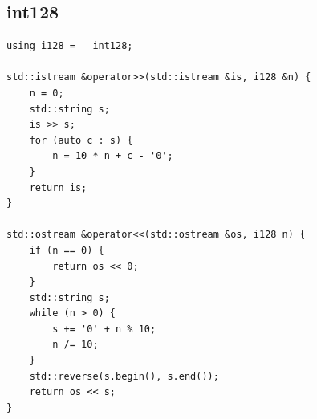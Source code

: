 \documentclass[twoside]{article}
\begin{document}
\subsection{int128}
\begin{lstlisting}
using i128 = __int128;
 
std::istream &operator>>(std::istream &is, i128 &n) {
    n = 0;
    std::string s;
    is >> s;
    for (auto c : s) {
        n = 10 * n + c - '0';
    }
    return is;
}
 
std::ostream &operator<<(std::ostream &os, i128 n) {
    if (n == 0) {
        return os << 0;
    }
    std::string s;
    while (n > 0) {
        s += '0' + n % 10;
        n /= 10;
    }
    std::reverse(s.begin(), s.end());
    return os << s;
}
\end{lstlisting}
\end{document}

